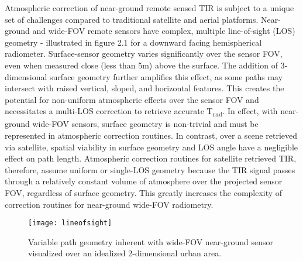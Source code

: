 Atmospheric correction of near-ground remote sensed TIR is subject to a unique set of challenges compared to traditional satellite and aerial platforms. Near-ground and wide-FOV remote sensors have complex, multiple line-of-sight (LOS) geometry - illustrated in figure 2.1 for a downward facing hemispherical radiometer. Surface-sensor geometry varies significantly over the sensor FOV, even when measured close (less than 5m) above the surface. The addition of 3-dimensional surface geometry further amplifies this effect, as some paths may intersect with raised vertical, sloped, and horizontal features. This creates the potential for non-uniform atmospheric effects over the sensor FOV and necessitates a multi-LOS correction to retrieve accurate T\textsubscript{rad}. In effect, with near-ground wide-FOV sensors, surface geometry is non-trivial and must be represented in atmospheric correction routines. In contrast, over a scene retrieved via satellite, spatial viability in surface geometry and LOS angle have a negligible effect on path length. Atmospheric correction routines for satellite retrieved TIR, therefore, assume uniform or single-LOS geometry because the TIR signal passes through a relatively constant volume of atmosphere over the projected sensor FOV, regardless of surface geometry. This greatly increases the complexity of correction routines for near-ground wide-FOV radiometry. 

\begin{figure}[!ht]
	\texttt{[image: lineofsight]}
	\label{lineofsight}
	\caption{Variable path geometry inherent with wide-FOV near-ground sensor visualized over an idealized 2-dimensional urban area.}
\end{figure}

